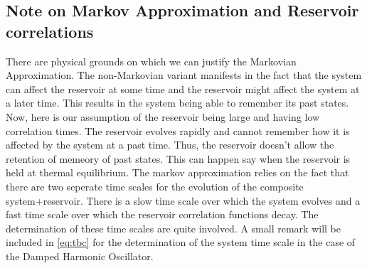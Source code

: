 \documentclass{scrartcl}
\newcommand{\1}{\mathbbm{1}}
\begin{document}
\subsection{Note on Markov Approximation and Reservoir correlations}
There are physical grounds on which we can justify the Markovian Approximation. The non-Markovian variant manifests in the 
fact that the system can affect the reservoir at some time and the reservoir might affect the system at a later time. This
results in the system being able to remember its past states. Now, here is our assumption of the reservoir being large and having low
correlation times. The reservoir evolves rapidly and cannot remember how it is affected by the system at a past time. Thus, 
the reservoir doesn't allow the retention of memeory of past states. This can happen say when the reservoir
is held at thermal equilibrium. The markov approximation relies on the fact that there are two seperate time scales for the evolution of the composite 
system+reservoir. There is a slow time scale over which the system evolves and a fast time scale over which the reservoir correlation functions decay.
The determination of these time scales are quite involved. A small remark will be included in \cref{eq:tbc} for the determination of the system 
time scale in the case of the Damped Harmonic Oscillator.
\end{document}
